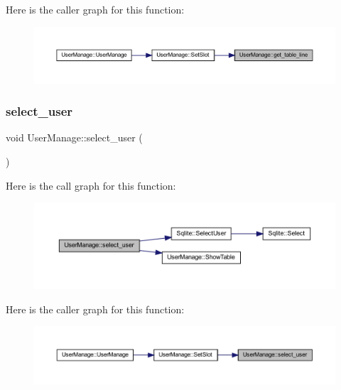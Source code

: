 Here is the caller graph for this function\+:
\nopagebreak
\begin{figure}[H]
\begin{center}
\leavevmode
\includegraphics[width=350pt]{class_user_manage_acf5b626b21868282ff4ad9dcccf8c765_icgraph}
\end{center}
\end{figure}
\mbox{\label{class_user_manage_aa6252c8286f24959ec4b938054328bf7}} 
\subsubsection{\texorpdfstring{select\_user}{select\_user}}
{\footnotesize\ttfamily void User\+Manage\+::select\+\_\+user (\begin{DoxyParamCaption}{ }\end{DoxyParamCaption})\hspace{0.3cm}{\ttfamily [slot]}}

Here is the call graph for this function\+:
\nopagebreak
\begin{figure}[H]
\begin{center}
\leavevmode
\includegraphics[width=350pt]{class_user_manage_aa6252c8286f24959ec4b938054328bf7_cgraph}
\end{center}
\end{figure}
Here is the caller graph for this function\+:
\nopagebreak
\begin{figure}[H]
\begin{center}
\leavevmode
\includegraphics[width=350pt]{class_user_manage_aa6252c8286f24959ec4b938054328bf7_icgraph}
\end{center}
\end{figure}
\mbox{\label{class_user_manage_ab4b39d4a967fc173c0a5ae5d3e2f2ef8}} 
